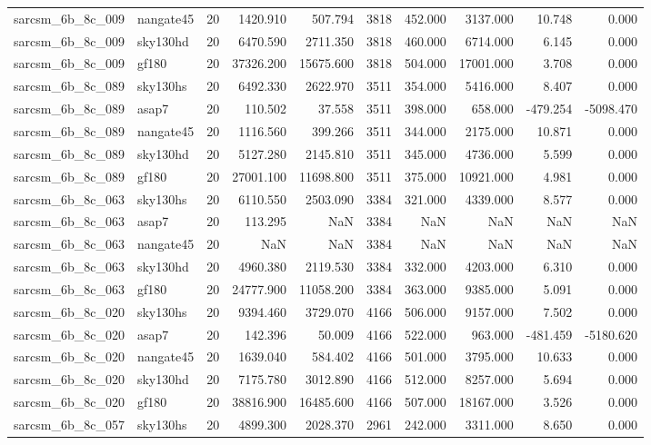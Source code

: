 \begin{longtable}{llrrrrrrrr}
sarcsm\_6b\_8c\_009 & nangate45 & 20 & 1420.910 & 507.794 & 3818 & 452.000 & 3137.000 & 10.748 & 0.000 \\
sarcsm\_6b\_8c\_009 & sky130hd & 20 & 6470.590 & 2711.350 & 3818 & 460.000 & 6714.000 & 6.145 & 0.000 \\
sarcsm\_6b\_8c\_009 & gf180 & 20 & 37326.200 & 15675.600 & 3818 & 504.000 & 17001.000 & 3.708 & 0.000 \\
sarcsm\_6b\_8c\_089 & sky130hs & 20 & 6492.330 & 2622.970 & 3511 & 354.000 & 5416.000 & 8.407 & 0.000 \\
sarcsm\_6b\_8c\_089 & asap7 & 20 & 110.502 & 37.558 & 3511 & 398.000 & 658.000 & -479.254 & -5098.470 \\
sarcsm\_6b\_8c\_089 & nangate45 & 20 & 1116.560 & 399.266 & 3511 & 344.000 & 2175.000 & 10.871 & 0.000 \\
sarcsm\_6b\_8c\_089 & sky130hd & 20 & 5127.280 & 2145.810 & 3511 & 345.000 & 4736.000 & 5.599 & 0.000 \\
sarcsm\_6b\_8c\_089 & gf180 & 20 & 27001.100 & 11698.800 & 3511 & 375.000 & 10921.000 & 4.981 & 0.000 \\
sarcsm\_6b\_8c\_063 & sky130hs & 20 & 6110.550 & 2503.090 & 3384 & 321.000 & 4339.000 & 8.577 & 0.000 \\
sarcsm\_6b\_8c\_063 & asap7 & 20 & 113.295 & NaN & 3384 & NaN & NaN & NaN & NaN \\
sarcsm\_6b\_8c\_063 & nangate45 & 20 & NaN & NaN & 3384 & NaN & NaN & NaN & NaN \\
sarcsm\_6b\_8c\_063 & sky130hd & 20 & 4960.380 & 2119.530 & 3384 & 332.000 & 4203.000 & 6.310 & 0.000 \\
sarcsm\_6b\_8c\_063 & gf180 & 20 & 24777.900 & 11058.200 & 3384 & 363.000 & 9385.000 & 5.091 & 0.000 \\
sarcsm\_6b\_8c\_020 & sky130hs & 20 & 9394.460 & 3729.070 & 4166 & 506.000 & 9157.000 & 7.502 & 0.000 \\
sarcsm\_6b\_8c\_020 & asap7 & 20 & 142.396 & 50.009 & 4166 & 522.000 & 963.000 & -481.459 & -5180.620 \\
sarcsm\_6b\_8c\_020 & nangate45 & 20 & 1639.040 & 584.402 & 4166 & 501.000 & 3795.000 & 10.633 & 0.000 \\
sarcsm\_6b\_8c\_020 & sky130hd & 20 & 7175.780 & 3012.890 & 4166 & 512.000 & 8257.000 & 5.694 & 0.000 \\
sarcsm\_6b\_8c\_020 & gf180 & 20 & 38816.900 & 16485.600 & 4166 & 507.000 & 18167.000 & 3.526 & 0.000 \\
sarcsm\_6b\_8c\_057 & sky130hs & 20 & 4899.300 & 2028.370 & 2961 & 242.000 & 3311.000 & 8.650 & 0.000 \\

\end{longtable}
